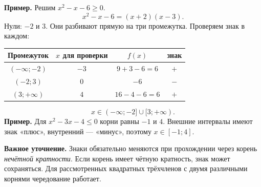 \documentclass[a4paper,12pt]{article}
\newcommand{\ex}[1]{\textcolor{darkaccent}{\textbf{Пример.}} #1}
\begin{document}
\ex{Решим \(x^2-x-6\ge0\).}
\[
x^2-x-6=(x+2)(x-3).
\]
Нули: \(-2\) и \(3\). Они разбивают прямую на три промежутка. Проверяем знак в каждом:
\begin{center}
\begin{tabular}{@{}cccc@{}}
\toprule
Промежуток & \(x\) для проверки & \(f(x)\) & знак\\
\midrule
\(( -\infty;-2)\) & \(-3\) & \(9+3-6=6\) & \(+\)\\
\((-2;3)\) & \(0\) & \(-6\) & \(-\)\\
\((3;+\infty)\) & \(4\) & \(16-4-6=6\) & \(+\)\\
\bottomrule
\end{tabular}
\end{center}
\begin{center}
\end{center}
\[
\boxed{x\in(-\infty;-2]\cup[3;+\infty)}.
\]
\ex{Для \(x^2-3x-4\le0\) корни равны \(-1\) и \(4\). Внешние интервалы имеют знак «плюс», внутренний --- «минус», поэтому \(x\in[-1;4]\).}

\textcolor{darkaccent}{\textbf{Важное уточнение.}} Знаки обязательно меняются при прохождении через корень \emph{нечётной кратности}. Если корень имеет чётную кратность, знак может сохраняться. Для рассмотренных квадратных трёхчленов с двумя различными корнями чередование работает.
\end{document}
